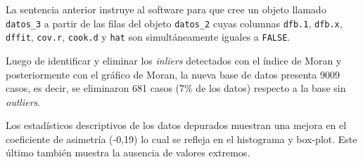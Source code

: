 \documentclass[11pt,b5paper,]{krantz}
\newenvironment{Shaded}{}{}
\newcommand{\KeywordTok}[1]{\textcolor[rgb]{0.00,0.44,0.13}{\textbf{#1}}}
\newcommand{\DecValTok}[1]{\textcolor[rgb]{0.25,0.63,0.44}{#1}}
\newcommand{\FloatTok}[1]{\textcolor[rgb]{0.25,0.63,0.44}{#1}}
\newcommand{\StringTok}[1]{\textcolor[rgb]{0.25,0.44,0.63}{#1}}
\newcommand{\CommentTok}[1]{\textcolor[rgb]{0.38,0.63,0.69}{\textit{#1}}}
\newcommand{\OtherTok}[1]{\textcolor[rgb]{0.00,0.44,0.13}{#1}}
\newcommand{\OperatorTok}[1]{\textcolor[rgb]{0.40,0.40,0.40}{#1}}
\newcommand{\NormalTok}[1]{#1}
\begin{document}
La sentencia anterior instruye al software para que cree un objeto
llamado \texttt{datos\_3} a partir de las filas del objeto
\texttt{datos\_2} cuyas columnas \texttt{dfb.1}, \texttt{dfb.x},
\texttt{dffit}, \texttt{cov.r}, \texttt{cook.d} y \texttt{hat} son
simultáneamente iguales a \texttt{FALSE}.

\begin{Shaded}
\end{Shaded}

Luego de identificar y eliminar los \emph{inliers} detectados con el
índice de Moran y posteriormente con el gráfico de Moran, la nueva base
de datos presenta 9009 casos, es decir, se eliminaron 681 casos (7\% de
los datos) respecto a la base sin \emph{outliers}.

Los estadísticos descriptivos de los datos depurados muestran una mejora
en el coeficiente de asimetría (-0,19) lo cual se refleja en el
histograma y box-plot. Este último también muestra la ausencia de
valores extremos.

\begin{Shaded}
\end{Shaded}
\end{document}
